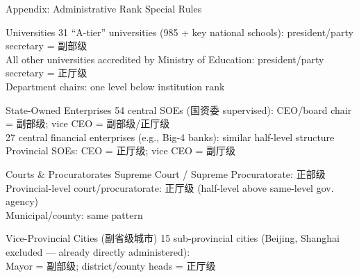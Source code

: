 \documentclass[aspectratio=169, 10pt]{beamer}
\begin{document}
\begin{frame}{Appendix: Administrative Rank Special Rules}
  \begin{block}{Universities}
    \scriptsize
    31 ``A-tier'' universities (985 + key national schools): president/party secretary = 副部级\\
    All other universities accredited by Ministry of Education: president/party secretary = 正厅级\\
    Department chairs: one level below institution rank
  \end{block}

  \smallskip
  \begin{block}{State-Owned Enterprises}
    \scriptsize
    54 central SOEs (国资委 supervised): CEO/board chair = 副部级; vice CEO = 副部级/正厅级\\
    27 central financial enterprises (e.g., Big-4 banks): similar half-level structure\\
    Provincial SOEs: CEO = 正厅级; vice CEO = 副厅级
  \end{block}

  \smallskip
  \begin{block}{Courts \& Procuratorates}
    \scriptsize
    Supreme Court / Supreme Procuratorate: 正部级\\
    Provincial-level court/procuratorate: 正厅级 (half-level above same-level gov. agency)\\
    Municipal/county: same pattern
  \end{block}

  \smallskip
  \begin{block}{Vice-Provincial Cities (副省级城市)}
    \scriptsize
    15 sub-provincial cities (Beijing, Shanghai excluded — already directly administered):\\
    Mayor = 副部级; district/county heads = 正厅级
  \end{block}
\end{frame}
\end{document}
